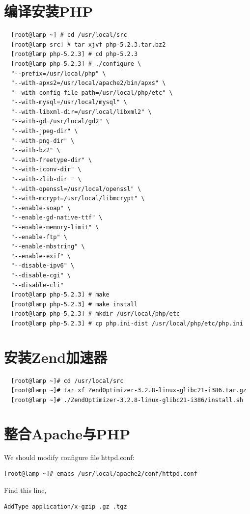 \section{编译安装PHP}

\small{
\begin{verbatim}
  [root@lamp ~] # cd /usr/local/src
  [root@lamp src] # tar xjvf php-5.2.3.tar.bz2
  [root@lamp php-5.2.3] # cd php-5.2.3
  [root@lamp php-5.2.3] # ./configure \
  "--prefix=/usr/local/php" \
  "--with-apxs2=/usr/local/apache2/bin/apxs" \
  "--with-config-file-path=/usr/local/php/etc" \
  "--with-mysql=/usr/local/mysql" \
  "--with-libxml-dir=/usr/local/libxml2" \
  "--with-gd=/usr/local/gd2" \
  "--with-jpeg-dir" \
  "--with-png-dir" \
  "--with-bz2" \
  "--with-freetype-dir" \
  "--with-iconv-dir" \
  "--with-zlib-dir " \
  "--with-openssl=/usr/local/openssl" \
  "--with-mcrypt=/usr/local/libmcrypt" \
  "--enable-soap" \
  "--enable-gd-native-ttf" \
  "--enable-memory-limit" \
  "--enable-ftp" \
  "--enable-mbstring" \
  "--enable-exif" \
  "--disable-ipv6" \
  "--disable-cgi" \
  "--disable-cli"
  [root@lamp php-5.2.3] # make
  [root@lamp php-5.2.3] # make install
  [root@lamp php-5.2.3] # mkdir /usr/local/php/etc
  [root@lamp php-5.2.3] # cp php.ini-dist /usr/local/php/etc/php.ini
\end{verbatim}
}
\normalsize

\section{安装Zend加速器}

\small{
\begin{verbatim}
  [root@lamp ~]# cd /usr/local/src
  [root@lamp ~]# tar xf ZendOptimizer-3.2.8-linux-glibc21-i386.tar.gz
  [root@lamp ~]# ./ZendOptimizer-3.2.8-linux-glibc21-i386/install.sh
\end{verbatim}
}
\normalsize

\section{整合Apache与PHP}

We should modify configure file httpd.conf:

\small{
\begin{verbatim}
[root@lamp ~]# emacs /usr/local/apache2/conf/httpd.conf
\end{verbatim}
}
\normalsize

Find this line,

\small{
\begin{verbatim}
AddType application/x-gzip .gz .tgz
\end{verbatim}
}
\normalsize

